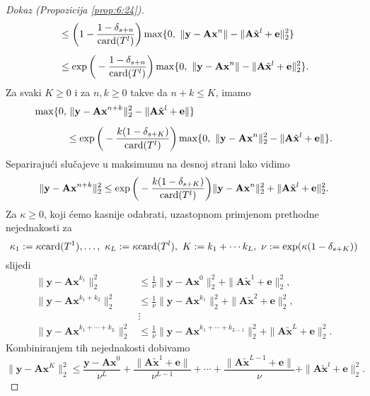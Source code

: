 \documentclass[a4paper,twoside,12pt]{memoir} %
\newcommand{\vect}[1]{\mathbf{#1}}
\renewcommand{\vec}{\vect}
\newcommand{\card}{\text{\normalfont{card}}}
\newcommand{\norm}[1]{\|{#1}\|}
\begin{document}
\begin{proof}[Dokaz (Propozicija \ref{prop:6:24})]
\begin{align*}
        & \leq \bigg(1- \frac{1-\delta_{s+n}}{\card(T^l)} \bigg) \max \{0,\ \norm{\vec y - \vec{Ax}^n} - \norm{\vec{A}\tilde{\vec x}^l + \vec e}_2^2\}\\[0.5em]
        & \leq \exp \bigg( -\frac{1-\delta_{s+n}}{\card(T^l)} \bigg) \max \{0,\ \norm{\vec y - \vec{Ax}^n} - \norm{\vec{A}\tilde{\vec x}^l + \vec e}_2^2\}.
    \end{align*}
    Za svaki $K \geq 0$ i za $n,k \geq 0$ takve da $n+k \leq K$, imamo
    \begin{align*}
        \max \{ 0,&\ \norm{\vec y - \vec{Ax}^{n+k}}_2^2 - \norm{\vec A \tilde{\vec x}^l + \vec e}\}\\[0.5em]
        & \leq \exp \bigg( - \frac{k(1-\delta_{s+K})}{\card(T^l)} \bigg) \max \{ 0,\ \norm{\vec y - \vec{Ax}^{n}}_2^2 - \norm{\vec A \tilde{\vec x}^l + \vec e}\}.
    \end{align*}
    Separiraju\'ci slu\v{c}ajeve u maksimumu na desnoj strani lako vidimo
    \begin{equation*}
        \norm{\vec y - \vec{Ax}^{n+k}}_2^2 \leq \exp \bigg( -\frac{k(1-\delta_{s+K})}{\card(T^l)} \bigg) \norm{\vec y - \vec{Ax}^n}_2^2 + \norm{\vec A \tilde{\vec x}^l + \vec e}_2^2.
    \end{equation*}
    Za $\kappa \geq 0$, koji \'cemo kasnije odabrati, uzastopnom primjenom prethodne nejednakosti za
    \begin{equation*}
        \kappa_1 := \kappa \card(T^1),\dots,\ \kappa_L := \kappa \card(T^l),\ K:=k_1+ \cdots k_L,\ \nu := \exp(\kappa(1-\delta_{s+K}))
    \end{equation*}
    slijedi
    \begin{align*}
        \norm{\vec y - \vec{Ax}^{k_1}}_2^2 & \leq \frac{1}{\nu} \norm{\vec y - \vec {Ax}^{0}}_2^2 + \norm{\vec{A}\tilde{\vec x}^{1} + \vec e}_2^2,\\[0.5em]
        \norm{\vec y - \vec{Ax}^{k_1+k_2}}_2^2 & \leq \frac{1}{\nu} \norm{\vec y - \vec {Ax}^{k_1}}_2^2 + \norm{\vec{A}\tilde{\vec x}^{2} + \vec e}_2^2,\\[0.5em]
        & \vdots\\[0.5em]
        \norm{\vec y - \vec{Ax}^{k_1+\cdots+k_L}}_2^2 & \leq \frac{1}{\nu} \norm{\vec y - \vec {Ax}^{k_1+\cdots+k_{L-1}}}_2^2 + \norm{\vec{A}\tilde{\vec x}^{L} + \vec e}_2^2.
    \end{align*}
    Kombiniranjem tih nejednakosti dobivamo
    \begin{equation*}
        \norm{\vec y - \vec{Ax}^K}_2^2 \leq \frac{\vec y - \vec{Ax}^0}{\nu^L}+\frac{\norm{\vec A \tilde{\vec x}^{1}+ \vec e}}{\nu^{L-1}}+\cdots+\frac{\norm{\vec A \tilde{\vec x}^{L-1} + \vec e}}{\nu}+ \norm{\vec A \tilde{\vec x}^l + \vec e}_2^2.

\end{equation*}
\end{proof}
\end{document}
